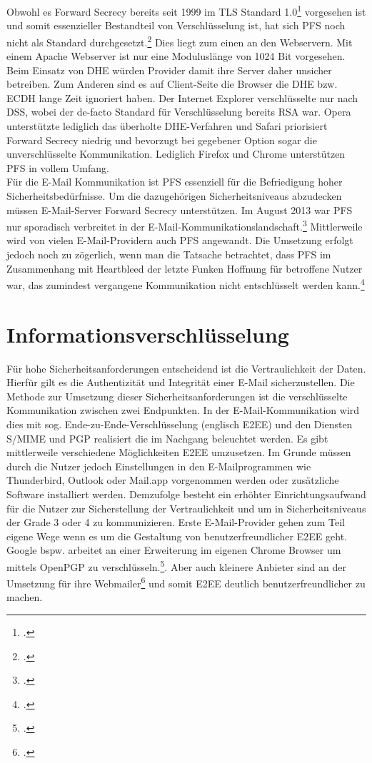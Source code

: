 \documentclass  [paper=a4,
				fontsize=12pt,
				listof=totoc,
				bibliography=totoc
				]{scrreprt}
\begin{document}
				Obwohl es Forward Secrecy bereits seit 1999 im \ac{TLS} Standard 1.0\footcite[Vgl.][]{Boeck2013} vorgesehen ist und somit essenzieller Bestandteil von Verschlüsselung ist, hat sich \ac{PFS} noch nicht als Standard durchgesetzt.\footcite{SSLLabs} Dies liegt zum einen an den Webservern. Mit einem Apache Webserver ist nur eine Moduluslänge von 1024 Bit vorgesehen. Beim Einsatz von \ac{DHE} würden Provider damit ihre Server daher unsicher betreiben. Zum Anderen sind es auf Client-Seite die Browser die \ac{DHE} bzw. \ac{ECDH} lange Zeit ignoriert haben. Der Internet Explorer verschlüsselte nur nach DSS, wobei der de-facto Standard für Verschlüsselung bereits \ac{RSA} war. Opera unterstützte lediglich das überholte \ac{DHE}-Verfahren und Safari priorisiert Forward Secrecy niedrig und bevorzugt bei gegebener Option sogar die unverschlüsselte Kommunikation. Lediglich Firefox und Chrome unterstützen \ac{PFS} in vollem Umfang.\medskip\\
				Für die E-Mail Kommunikation ist \ac{PFS} essenziell für die Befriedigung hoher Sicherheitsbedürfnisse. Um die dazugehörigen Sicherheitsniveaus abzudecken müssen E-Mail-Server Forward Secrecy unterstützen. Im August 2013 war \ac{PFS} nur sporadisch verbreitet in der E-Mail-Kommunikationslandschaft.\footcite[Vgl. ][]{Schulz2014} Mittlerweile wird von vielen E-Mail-Providern auch \ac{PFS} angewandt. Die Umsetzung erfolgt jedoch noch zu zögerlich, wenn man die Tatsache betrachtet, dass \ac{PFS} im Zusammenhang mit Heartbleed der letzte Funken Hoffnung für betroffene Nutzer war, das zumindest vergangene Kommunikation nicht entschlüsselt werden kann.\footcite[Vgl.][]{Zhu2014}
		
		\section{Informationsverschlüsselung}
			Für hohe Sicherheitsanforderungen entscheidend ist die Vertraulichkeit der Daten. Hierfür gilt es die Authentizität und Integrität einer E-Mail sicherzustellen. Die Methode zur Umsetzung dieser Sicherheitsanforderungen ist die verschlüsselte Kommunikation zwischen zwei Endpunkten. In der E-Mail-Kommunikation wird dies mit sog. Ende-zu-Ende-Verschlüsselung (englisch \ac{E2EE}) und den Diensten S/MIME und \ac{PGP} realisiert die im Nachgang beleuchtet werden.
			Es gibt mittlerweile verschiedene Möglichkeiten \ac{E2EE} umzusetzen. Im Grunde müssen durch die Nutzer jedoch Einstellungen in den E-Mailprogrammen wie Thunderbird, Outlook oder Mail.app vorgenommen werden oder zusätzliche Software installiert werden. Demzufolge besteht ein erhöhter Einrichtungsaufwand für die Nutzer zur Sicherstellung der Vertraulichkeit und um in Sicherheitsniveaus der Grade 3 oder 4 zu kommunizieren.\medskip
			Erste E-Mail-Provider gehen zum Teil eigene Wege wenn es um die Gestaltung von benutzerfreundlicher \ac{E2EE} geht. Google bspw. arbeitet an einer Erweiterung im eigenen Chrome Browser um mittels OpenPGP zu verschlüsseln.\footcite[Vgl.][]{Somogyi2013}. Aber auch kleinere Anbieter sind an der Umsetzung für ihre Webmailer\footcite[Vgl.][]{Posteo2013} und somit \ac{E2EE} deutlich benutzerfreundlicher zu machen. 
			
\end{document}
